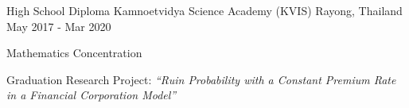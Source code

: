 \begin{cventries}
  \cventry
    {High School Diploma} %
    {Kamnoetvidya Science Academy (KVIS)} %
    {Rayong, Thailand} %
    {May 2017 - Mar 2020} %
    {
      \begin{cvitems} %
        \item {Mathematics Concentration}
        \item {Graduation Research Project: \textit{``Ruin Probability with a Constant Premium Rate in a Financial Corporation Model''}}
      \end{cvitems}
    }

\end{cventries}

